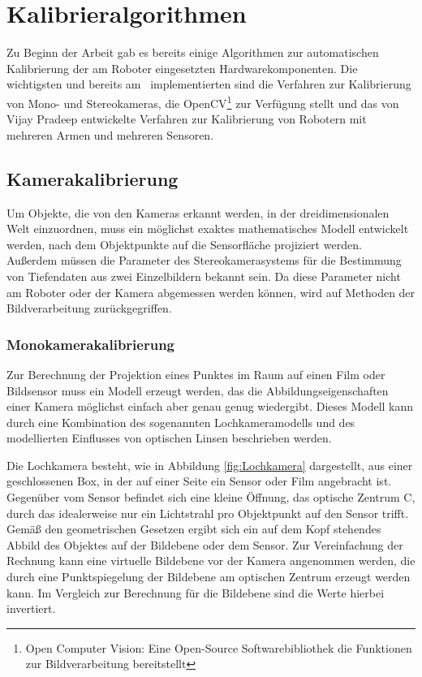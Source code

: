 
\section{Kalibrieralgorithmen} %

\label{sub:Kalibrieralgorithmen}


Zu Beginn der Arbeit gab es bereits einige Algorithmen zur automatischen
Kalibrierung der am Roboter eingesetzten Hardwarekomponenten. Die wichtigsten
und bereits am \cob\ implementierten sind die Verfahren zur Kalibrierung von
Mono- und Stereokameras, die OpenCV\footnote{Open Computer Vision: Eine 
Open-Source Softwarebibliothek die Funktionen zur Bildverarbeitung bereitstellt}
zur Verfügung stellt und das von Vijay
Pradeep entwickelte Verfahren\cite{Pradeep2010} zur Kalibrierung von Robotern
mit mehreren Armen und mehreren Sensoren.


\subsection{Kamerakalibrierung} %

\label{sub:Kamerakalibrierung}


Um
Objekte, die von den Kameras erkannt werden, in der dreidimensionalen Welt
einzuordnen, muss ein möglichst exaktes mathematisches Modell entwickelt werden,
nach dem Objektpunkte auf die Sensorfläche projiziert werden. Außerdem müssen
die Parameter des Stereokamerasystems für die Bestimmung von Tiefendaten aus
zwei Einzelbildern bekannt sein. Da diese Parameter nicht am
Roboter oder der Kamera abgemessen werden können, wird auf Methoden der
Bildverarbeitung zurückgegriffen.

\subsubsection{Monokamerakalibrierung} %

\label{ssub:Monokamera}


Zur Berechnung der Projektion eines Punktes im Raum auf einen Film oder
Bildsensor muss ein Modell erzeugt werden, das die Abbildungseigenschaften
einer Kamera möglichst einfach aber genau genug wiedergibt. Dieses Modell kann
durch eine Kombination des sogenannten Lochkameramodells und des modellierten
Einflusses von optischen Linsen beschrieben werden.\cite{Bradski2008}

Die Lochkamera besteht, wie in Abbildung \ref{fig:Lochkamera} dargestellt, aus einer 
geschlossenen Box, in der auf einer Seite ein
Sensor oder Film angebracht ist. Gegenüber vom Sensor befindet sich eine kleine
Öffnung, das optische Zentrum C, durch das idealerweise nur ein Lichtstrahl pro
Objektpunkt auf den Sensor
trifft. Gemäß den geometrischen Gesetzen ergibt sich ein auf dem Kopf stehendes
Abbild des Objektes auf der Bildebene oder dem Sensor. Zur Vereinfachung der
Rechnung kann eine virtuelle Bildebene vor der Kamera angenommen werden, die
durch eine Punktspiegelung der Bildebene am optischen Zentrum erzeugt werden
kann. Im Vergleich zur Berechnung für die Bildebene sind die Werte hierbei
invertiert.\cite{forsyth2011}


